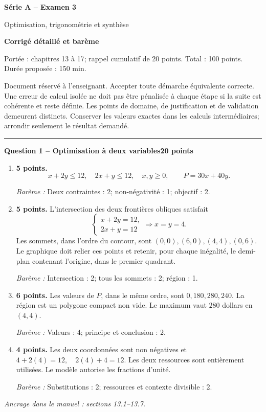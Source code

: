 \documentclass[11pt,a4paper]{article}
\begin{document}
{\LARGE\bfseries Série A -- Examen 3}\par
{\large Optimisation, trigonométrie et synthèse}\par
\textbf{Corrigé détaillé et barème}\par
Portée : chapitres 13 à 17; rappel cumulatif de 20 points. Total : 100 points. Durée proposée : 150 min.\par
\small Document réservé à l’enseignant. Accepter toute démarche équivalente correcte. Une erreur de calcul isolée ne doit pas être pénalisée à chaque étape si la suite est cohérente et reste définie. Les points de domaine, de justification et de validation demeurent distincts. Conserver les valeurs exactes dans les calculs intermédiaires; arrondir seulement le résultat demandé.\normalsize\par
\vspace{3mm}\hrule\vspace{4mm}
{\large\bfseries Question 1 -- Optimisation à deux variables}\hfill\textbf{20 points}\par
\begin{enumerate}
\item \textbf{5 points.} \[x+2y\le 12,\quad 2x+y\le 12,\quad x,y\ge0,\qquad P=30x+40y.\]
\par{\small\textit{Barème : }Deux contraintes : 2; non-négativité : 1; objectif : 2.}
\item \textbf{5 points.} L’intersection des deux frontières obliques satisfait \[\begin{cases}x+2y=12,\\2x+y=12\end{cases}\Longrightarrow x=y=4.\] Les sommets, dans l’ordre du contour, sont \((0,0),(6,0),(4,4),(0,6)\). Le graphique doit relier ces points et retenir, pour chaque inégalité, le demi-plan contenant l’origine, dans le premier quadrant.
\par{\small\textit{Barème : }Intersection : 2; tous les sommets : 2; région : 1.}
\item \textbf{6 points.} Les valeurs de \(P\), dans le même ordre, sont \(0,180,280,240\). La région est un polygone compact non vide. Le maximum vaut \(280\) dollars en \((4,4)\).
\par{\small\textit{Barème : }Valeurs : 4; principe et conclusion : 2.}
\item \textbf{4 points.} Les deux coordonnées sont non négatives et \(4+2(4)=12,\quad2(4)+4=12\). Les deux ressources sont entièrement utilisées. Le modèle autorise les fractions d’unité.
\par{\small\textit{Barème : }Substitutions : 2; ressources et contexte divisible : 2.}
\end{enumerate}
\vfill {\small\textit{Ancrage dans le manuel : sections 13.1--13.7.}}
\end{document}
